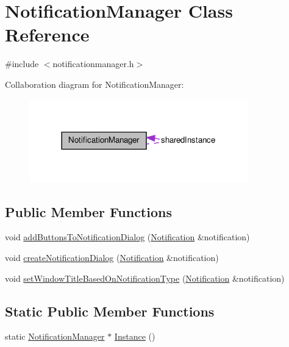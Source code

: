 \hypertarget{class_notification_manager}{
\section{NotificationManager Class Reference}
\label{class_notification_manager}
}


{\ttfamily \#include $<$notificationmanager.h$>$}



Collaboration diagram for NotificationManager:\nopagebreak
\begin{figure}[H]
\begin{center}
\leavevmode
\includegraphics[width=269pt]{class_notification_manager__coll__graph}
\end{center}
\end{figure}
\subsection*{Public Member Functions}
\begin{DoxyCompactItemize}
\item 
void \hyperlink{class_notification_manager_a1479ae381037129062610bc71c0a5744}{addButtonsToNotificationDialog} (\hyperlink{class_notification}{Notification} \&notification)
\item 
void \hyperlink{class_notification_manager_a1d30ee7ce01d51f33f219addca5395d9}{createNotificationDialog} (\hyperlink{class_notification}{Notification} \&notification)
\item 
void \hyperlink{class_notification_manager_a2c0a6908cd5d75059e7ada13355933c2}{setWindowTitleBasedOnNotificationType} (\hyperlink{class_notification}{Notification} \&notification)
\end{DoxyCompactItemize}
\subsection*{Static Public Member Functions}
\begin{DoxyCompactItemize}
\item 
static \hyperlink{class_notification_manager}{NotificationManager} $\ast$ \hyperlink{class_notification_manager_a2a2c1ff23e34f4689eb85f85e9b9b637}{Instance} ()
\end{DoxyCompactItemize}
